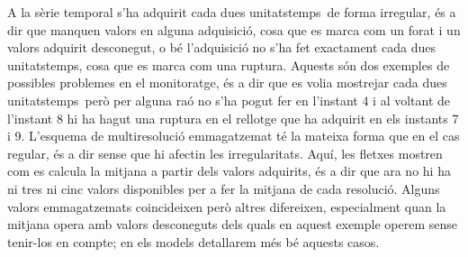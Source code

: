 A  la sèrie temporal s'ha
adquirit cada dues \gls{unitatstemps}\ de forma irregular, és a dir
que manquen valors en alguna adquisició, cosa que es marca com un
forat i un valors adquirit desconegut, o bé l'adquisició no s'ha fet
exactament cada dues \gls{unitatstemps}, cosa que es marca com una
ruptura. Aquests són dos exemples de possibles problemes en el
monitoratge, és a dir que es volia mostrejar cada dues
\gls{unitatstemps}\ però per alguna raó no s'ha pogut fer en l'instant
4 i al voltant de l'instant 8 hi ha hagut una ruptura en el rellotge
que ha adquirit en els instants 7 i 9.  L'esquema de multiresolució
emmagatzemat té la mateixa forma que en el cas regular, és a dir sense
que hi afectin les irregularitats. Aquí, les fletxes mostren com es
calcula la mitjana a partir dels valors adquirits, és a dir que ara no
hi ha ni tres ni cinc valors disponibles per a fer la mitjana de cada
resolució. Alguns valors emmagatzemats coincideixen però altres
difereixen, especialment quan la mitjana opera amb valors desconeguts
dels quals en aquest exemple operem sense tenir-los en compte; en els
models detallarem més bé aquests casos.













